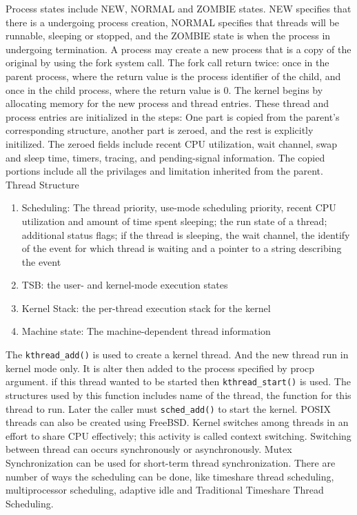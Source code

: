 \documentclass[letterpaper,10pt,draftclsnofoot,onecolumn]{IEEEtran}
\begin{document}
Process states include NEW, NORMAL and ZOMBIE states. NEW specifies that there is a undergoing process creation, NORMAL specifies that threads will be runnable, sleeping or stopped, and the ZOMBIE state is when the process in undergoing termination. A process may create a new process that is a copy of the original by using the fork system call. The fork call return twice: once in the parent process, where the return value is the process identifier of the child, and once in the child process, where the return value is 0.
The kernel begins by allocating memory for the new process and thread entries. These thread and process entries are initialized in the steps: One part is copied from the parent's corresponding structure, another part is zeroed, and the rest is explicitly initilized. The zeroed fields include recent CPU utilization, wait channel, swap and sleep time, timers, tracing, and pending-signal information. The copied portions include all the privilages and limitation inherited from the parent.
Thread Structure
\begin{enumerate}
\item Scheduling: The thread priority, use-mode scheduling priority, recent CPU utilization and amount of time spent sleeping; the run state of a thread; additional status flags; if the thread is sleeping, the wait channel, the identify of the event for which thread is waiting and a pointer to a string describing the event
\item TSB: the user- and kernel-mode execution states
\item Kernel Stack: the per-thread execution stack for the kernel
\item Machine state: The machine-dependent thread information\cite{[2]} \\
\end{enumerate}
The \verb|kthread_add()| is used to create a kernel thread. And the new thread run in kernel mode only. It is alter then added to the process specified by procp argument. if this thread wanted to be started then \verb|kthread_start()| is used. The structures used by this function includes name of the thread, the function for this thread to run. Later the caller must \verb|sched_add()| to start the kernel. POSIX threads can also be created using FreeBSD.
Kernel switches among threads in an effort to share CPU effectively; this activity is called context switching. Switching between thread can occurs synchronously or asynchronously. Mutex Synchronization can be used for short-term thread synchronization.
There are number of ways the scheduling can be done, like timeshare thread scheduling, multiprocessor scheduling, adaptive idle and Traditional Timeshare Thread Scheduling.\\
\end{document}
